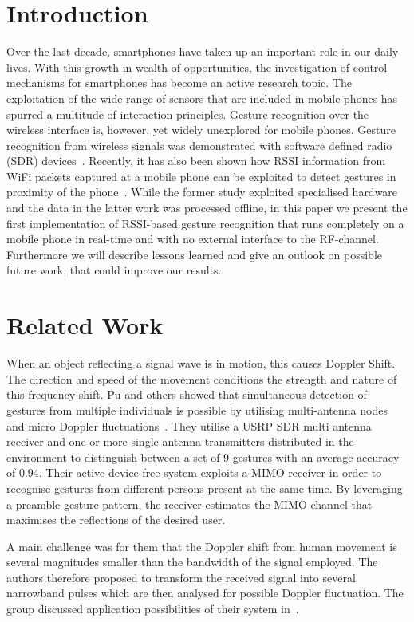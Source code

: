 \documentclass[conference]{IEEEtran}
\begin{document}
\section{Introduction}
Over the last decade, smartphones have taken up an important role in our daily lives. 
With this growth in wealth of opportunities, the investigation of control mechanisms for smartphones has become an active research topic. 
The exploitation of the wide range of sensors that are included in mobile phones has spurred a multitude of interaction principles.
Gesture recognition over the wireless interface is, however, yet widely unexplored for mobile phones.
Gesture recognition from wireless signals was demonstrated with software defined radio (SDR) devices~\cite{Pervasive_Adib_2013,RFsensing_Pu_2013}.
Recently, it has also been shown how RSSI information from WiFi packets captured at a mobile phone can be exploited to detect gestures in proximity of the phone~\cite{RFSensing_Sigg_2014}.
While the former study exploited specialised hardware and the data in the latter work was processed offline, in this paper we present the first implementation of RSSI-based gesture recognition that runs completely on a mobile phone in real-time and with no external interface to the RF-channel. 
Furthermore we will describe lessons learned and give an outlook on possible future work, that could improve our results.

\section{Related Work}
When an object reflecting a signal wave is in motion, this causes Doppler Shift. 
The direction and speed of the movement conditions the strength and nature of this frequency shift.
Pu and others showed that simultaneous detection of gestures from multiple individuals is possible by utilising multi-antenna nodes and micro Doppler fluctuations~\cite{RFsensing_Pu_2013,RFsensing_Kim_2009}.
They utilise a USRP SDR multi antenna receiver and one or more single antenna transmitters distributed in the environment to distinguish between a set of 9 gestures with an average accuracy of 0.94. 
Their active device-free system exploits a MIMO receiver in order to recognise gestures from different persons present at the same time. 
By leveraging a preamble gesture pattern, the receiver estimates the MIMO channel that maximises the reflections of the desired user.

A main challenge was for them that the Doppler shift from human movement is several magnitudes smaller than the bandwidth of the signal employed.
The authors therefore proposed to transform the received signal into several narrowband pulses which are then analysed for possible Doppler fluctuation.
The group discussed application possibilities of their system in~\cite{RFSensing_Kellog_2014}.
\end{document}
